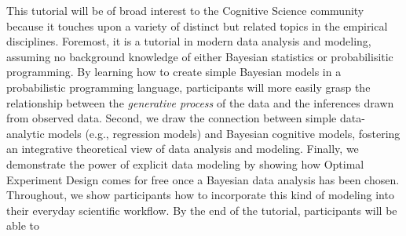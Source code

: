 \documentclass[10pt,letterpaper]{article}
\newcommand{\ndg}[1]{\textcolor{green}{[ndg: #1]}}
\begin{document}






This tutorial will be of broad interest to the Cognitive Science community because it touches upon a variety of distinct but related topics in the empirical disciplines. 
Foremost, it is a tutorial in modern data analysis and modeling, assuming no background knowledge of either Bayesian statistics or probabilisitic programming. 
By learning how to create simple Bayesian models in a probabilistic programming language, participants will more easily grasp the relationship between the \emph{generative process} of the data and the inferences drawn from observed data.
Second, we draw the connection between simple data-analytic models (e.g., regression models) and Bayesian cognitive models, fostering an integrative theoretical view of data analysis and modeling.
Finally, we demonstrate the power of explicit data modeling by showing how Optimal Experiment Design comes for free once a Bayesian data analysis has been chosen.
Throughout, we show participants how to incorporate this kind of modeling into their everyday scientific workflow. 
%
By the end of the tutorial, participants will be able to 
\end{document}
